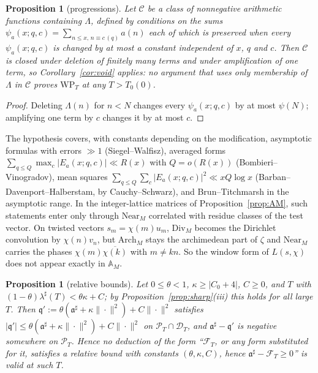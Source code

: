\documentclass[11pt]{amsart}
\newtheorem{proposition}[theorem]{Proposition}
\theoremstyle{definition}
\theoremstyle{remark}
\newcommand{\PT}{\mathcal P_T}
\begin{document}
\begin{proposition}[progressions]\label{prop:prog}
Let $\mathcal C$ be a class of nonnegative arithmetic functions containing $\Lambda$, defined by conditions on the sums
$\psi_a(x;q,c)=\sum_{n\le x,\,n\equiv c\,(q)}a(n)$ each of which is preserved when every $\psi_a(x;q,c)$ is changed by at most a
constant independent of $x$, $q$ and $c$. Then $\mathcal C$ is closed under deletion of finitely many terms and under
amplification of one term, so Corollary~\ref{cor:void} applies: no argument that uses only membership of $\Lambda$ in $\mathcal C$
proves $\mathrm{WP}_T$ at any $T>T_0(0)$.
\end{proposition}

\begin{proof}
Deleting $\Lambda(n)$ for $n<N$ changes every $\psi_a(x;q,c)$ by at most $\psi(N)$; amplifying one term by $c$ changes it by at most $c$.
\end{proof}

The hypothesis covers, with constants depending on the modification, asymptotic formulas with errors $\gg1$ (Siegel--Walfisz),
averaged forms $\sum_{q\le Q}\max_c|E_a(x;q,c)|\ll R(x)$ with $Q=o(R(x))$ (Bombieri--Vinogradov), mean squares
$\sum_{q\le Q}\sum_c|E_a(x;q,c)|^2\ll xQ\log x$ (Barban--Davenport--Halberstam, by Cauchy--Schwarz), and Brun--Titchmarsh in the
asymptotic range. In the integer-lattice matrices of Proposition~\ref{prop:AM}, such statements enter only through
$\mathrm{Near}_M$ correlated with residue classes of the test vector. On twisted vectors $s_m=\chi(m)u_m$, $\mathrm{Div}_M$ becomes the
Dirichlet convolution by $\chi(n)v_n$, but $\mathrm{Arch}_M$ stays the archimedean part of $\zeta$ and $\mathrm{Near}_M$ carries the
phases $\chi(m)\overline{\chi(k)}$ with $m\ne kn$. So the window form of $L(s,\chi)$ does not appear exactly in $\mathbb A_M$.

\begin{proposition}[relative bounds]\label{prop:relative}
Let $0\le\theta<1$, $\kappa\ge|C_0+4|$, $C\ge0$, and $T$ with $(1-\theta)\lambda^\sharp(T)<\theta\kappa+C$; by
Proposition~\ref{prop:sharp}(iii) this holds for all large $T$. Then
$\mathfrak q':=\theta(\mathfrak a^\sharp+\kappa\|\cdot\|^2)+C\|\cdot\|^2$ satisfies $|\mathfrak q'|\le\theta(\mathfrak a^\sharp+\kappa\|\cdot\|^2)+C\|\cdot\|^2$ on
$\PT\cap\mathcal D_T$, and $\mathfrak a^\sharp-\mathfrak q'$ is negative somewhere on $\PT$. Hence no deduction of the form ``$\mathcal F_T$, or
any form substituted for it, satisfies a relative bound with constants $(\theta,\kappa,C)$, hence $\mathfrak a^\sharp-\mathcal F_T\ge0$'' is
valid at such $T$.
\end{proposition}
\end{document}
